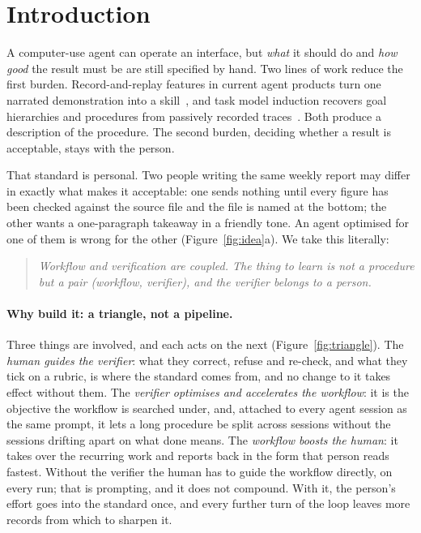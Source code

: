 \documentclass[10pt]{article}
\begin{document}
\section{Introduction}

A computer-use agent can operate an interface, but \emph{what} it should do and \emph{how good} the result must be
are still specified by hand. Two lines of work reduce the first burden. Record-and-replay features in current
agent products turn one narrated demonstration into a skill~\cite{recordskill,recordreplay,skillrecorder}, and task
model induction recovers goal hierarchies and procedures from passively recorded
traces~\cite{tmi}. Both produce a description of the procedure. The second burden, deciding whether a result is
acceptable, stays with the person.

That standard is personal. Two people writing the same weekly report may differ in exactly what makes it
acceptable: one sends nothing until every figure has been checked against the source file and the file is named
at the bottom; the other wants a one-paragraph takeaway in a friendly tone. An agent optimised for one of them
is wrong for the other (Figure~\ref{fig:idea}a). We take this literally:

\begin{quote}
\emph{Workflow and verification are coupled. The thing to learn is not a procedure but a pair
(workflow, verifier), and the verifier belongs to a person.}
\end{quote}

\paragraph{Why build it: a triangle, not a pipeline.} Three things are involved, and each acts on the next
(Figure~\ref{fig:triangle}). The \emph{human guides the verifier}: what they correct, refuse and re-check, and
what they tick on a rubric, is where the standard comes from, and no change to it takes effect without them. The
\emph{verifier optimises and accelerates the workflow}: it is the objective the workflow is searched under, and,
attached to every agent session as the same prompt, it lets a long procedure be split across sessions without the
sessions drifting apart on what done means. The \emph{workflow boosts the human}: it takes over the recurring
work and reports back in the form that person reads fastest. Without the verifier the human has to guide the
workflow directly, on every run; that is prompting, and it does not compound. With it, the person's effort goes
into the standard once, and every further turn of the loop leaves more records from which to sharpen it.
\end{document}
